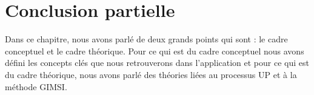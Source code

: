     \section[Conclusion partielle]{Conclusion partielle}
    Dans ce chapitre, nous avons parlé de deux grands points qui sont : le cadre conceptuel
    et le cadre théorique. Pour ce qui est du cadre conceptuel nous avons défini
    les concepts clés que nous retrouverons dans l’application et pour ce qui est du cadre théorique,
    nous avons parlé des théories liées au processus UP et à la méthode GIMSI. 